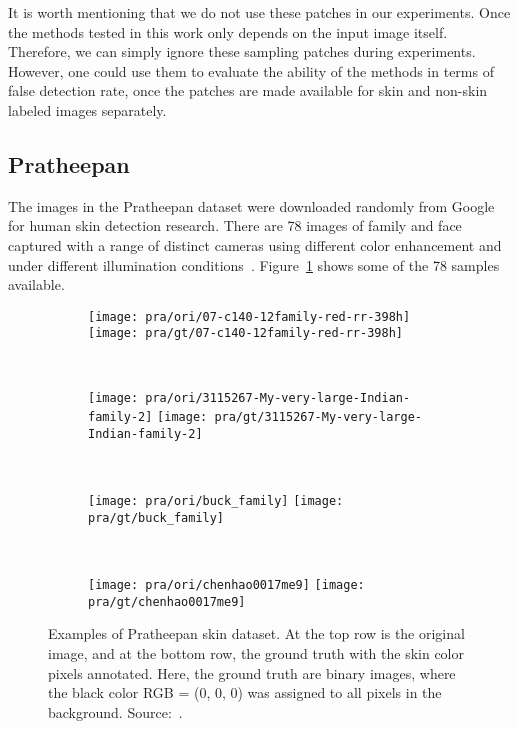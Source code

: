 It is worth mentioning that we do not use these patches in our experiments. Once the methods tested in this work only depends on the input image itself. Therefore, we can simply ignore these sampling patches during experiments. However, one could use them to evaluate the ability of the methods in terms of false detection rate, once the patches are made available for skin and non-skin labeled images separately.


\subsection{Pratheepan}
\label{sec:datasets_pratheepan}
The images in the Pratheepan dataset were downloaded randomly from Google for human skin detection research. There are 78 images of family and face captured with a range of distinct cameras using different color enhancement and under different illumination conditions~\cite{tan:12}. Figure~\ref{fig:pra_dataset_exemplo} shows some of the 78 samples available.

\begin{figure}[H]
    \centering
    \begin{subfigure}[t]{0.238\textwidth}
        \texttt{[image: pra/ori/07-c140-12family-red-rr-398h]}
        \texttt{[image: pra/gt/07-c140-12family-red-rr-398h]}
    \end{subfigure}
    ~
    \begin{subfigure}[t]{0.25\textwidth}
        \texttt{[image: pra/ori/3115267-My-very-large-Indian-family-2]}
        \texttt{[image: pra/gt/3115267-My-very-large-Indian-family-2]}
    \end{subfigure}
    ~
    \begin{subfigure}[t]{0.25\textwidth}
        \texttt{[image: pra/ori/buck\_family]}
        \texttt{[image: pra/gt/buck\_family]}
    \end{subfigure}
    ~
    \begin{subfigure}[t]{0.141\textwidth}
        \texttt{[image: pra/ori/chenhao0017me9]}
        \texttt{[image: pra/gt/chenhao0017me9]}
    \end{subfigure}
    \caption[Examples of Pratheepan skin dataset]{Examples of Pratheepan skin dataset. At the top row is the original image, and at the bottom row, the ground truth with the skin color pixels annotated. Here, the ground truth are binary images, where the black color RGB = (0, 0, 0) was assigned to all pixels in the background. Source:~\citet{tan:12}.}
    \label{fig:pra_dataset_exemplo}
\end{figure}


